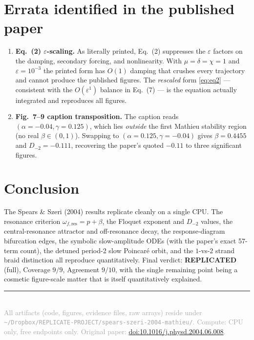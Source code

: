 \documentclass[11pt]{article}
\newcommand{\repl}{\textcolor{repgreen}{\textbf{REPLICATED}}}
\newcommand{\wfres}{\omega_{f,\mathrm{res}}}
\begin{document}
\section{Errata identified in the published paper}
\label{sec:errata}
\begin{enumerate}[leftmargin=1.4em]
\item \textbf{Eq.~(2) $\varepsilon$-scaling.} As literally printed, Eq.~(2) suppresses the
$\varepsilon$ factors on the damping, secondary forcing, and nonlinearity. With
$\mu=\delta=\chi=1$ and $\varepsilon=10^{-3}$ the printed form has $O(1)$ damping that crushes
every trajectory and cannot produce the published figures. The \emph{rescaled} form
\eqref{eq:eq2} --- consistent with the $O(\varepsilon^1)$ balance in Eq.~(7) --- is the
equation actually integrated and reproduces all figures.
\item \textbf{Fig.~7--9 caption transposition.} The caption reads
$(\alpha=-0.04,\gamma=0.125)$, which lies \emph{outside} the first Mathieu stability region
(no real $\beta\in(0,1)$). Swapping to $(\alpha=0.125,\gamma=-0.04)$ gives $\beta=0.4455$ and
$D_{-2}=-0.111$, recovering the paper's quoted $-0.11$ to three significant figures.
\end{enumerate}

\section{Conclusion}
The Spears \& Szeri (2004) results replicate cleanly on a single CPU. The resonance criterion
$\wfres=p+\beta$, the Floquet exponent and $D_{-2}$ values, the central-resonance attractor and
off-resonance decay, the response-diagram bifurcation edges, the symbolic slow-amplitude ODEs
(with the paper's exact 57-term count), the detuned period-2 slow Poincar\'e orbit, and the
$1$-vs-$2$ strand braid distinction all reproduce quantitatively. Final verdict:
\repl{} (full), Coverage $9/9$, Agreement $9/10$, with the single remaining point being a
cosmetic figure-scale matter that is itself quantitatively explained.

\vspace{1em}
\noindent\rule{\textwidth}{0.4pt}\\
{\small\textcolor{darkgray}{All artifacts (code, figures, evidence files, raw arrays) reside under
\texttt{\textasciitilde/Dropbox/REPLICATE-PROJECT/spears-szeri-2004-mathieu/}. Compute: CPU
only, free endpoints only. Original paper:
\href{https://doi.org/10.1016/j.physd.2004.06.008}{doi:10.1016/j.physd.2004.06.008}.}}
\end{document}
